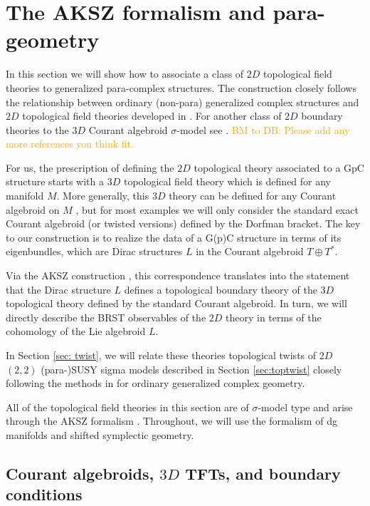 \documentclass{article}
\newcommand{\TT}{{T\oplus T^*}}
\theoremstyle{definition}
\theoremstyle{remark}
\def\brian{\textcolor{blue}{BM: }\textcolor{blue}}
\def\btd{\textcolor{orange}{BM to DB: }\textcolor{orange}}
\begin{document}
 

\section{The AKSZ formalism and para-geometry}
\def\fg{\mathfrak{g}}
In this section we will show how to associate a class of $2D$ topological field theories to generalized para-complex structures.
The construction closely follows the relationship between ordinary (non-para) generalized complex structures \cite{Gualtieri:2003dx} and $2D$ topological field theories developed in \cite{Cattaneo:2009zx, Pestun:2006rj}.
For another class of $2D$ boundary theories to the $3D$ Courant algebroid $\sigma$-model see \cite{SeveraTduality}. \btd{Please add any more references you think fit.}

For us, the prescription of defining the $2D$ topological theory associated to a GpC structure starts with a $3D$ topological field theory which is defined for any manifold $M$. 
More generally, this $3D$ theory can be defined for any Courant algebroid on $M$ \cite{Roytenberg:2002nu}, but for most examples we will only consider the standard exact Courant algebroid (or twisted versions) defined by the Dorfman bracket.
The key to our construction is to realize the data of a G(p)C structure in terms of its eigenbundles, which are Dirac structures $L$ in the Courant algebroid $\TT$. 

Via the AKSZ construction \cite{AKSZ}, this correspondence translates into the statement that the Dirac structure $L$ defines a topological boundary theory of the $3D$ topological theory defined by the standard Courant algebroid.
In turn, we will directly describe the BRST observables of the $2D$ theory in terms of the cohomology of the Lie algebroid $L$. 

In Section \ref{sec: twist}, we will relate these theories topological twists of $2D$ $(2,2)$ (para-)SUSY sigma models described in Section \ref{sec:toptwist} closely following the methods in \cite{Kapustin:2004gv} for ordinary generalized complex geometry.

All of the topological field theories in this section are of $\sigma$-model type and arise through the AKSZ formalism \cite{AKSZ}. 
Throughout, we will use the formalism of dg manifolds and shifted symplectic geometry. 

\subsection{Courant algebroids, $3D$ TFTs, and boundary conditions}
\end{document}
